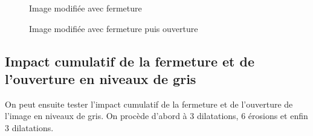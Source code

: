 \documentclass[french,a4paper,10pt]{article}
\begin{document}
\begin{figure}[!htb]
\begin{minipage}{0.30\textwidth}
			\caption{Image modifiée avec fermeture}\label{Fig:fermeture-ouverture-grey-08}
		\end{minipage}\hfill
		\begin{minipage}{0.30\textwidth}
			\centering
			\caption{Image modifiée avec fermeture puis ouverture}\label{Fig:ouverture-fermeture-grey-08}
		\end{minipage}
	\end{figure}

	\newpage
	\subsection{Impact cumulatif de la fermeture et de l'ouverture en niveaux de gris}\label{subsec:5.6}

	On peut ensuite tester l'impact cumulatif de la fermeture et de l'ouverture de l'image en niveaux de gris.
	On procède d'abord à 3 dilatations, 6 érosions et enfin 3 dilatations.
\end{document}
